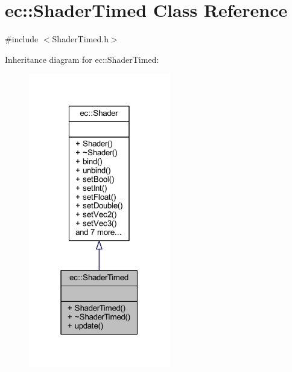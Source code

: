 \hypertarget{classec_1_1_shader_timed}{}\section{ec\+:\+:Shader\+Timed Class Reference}
\label{classec_1_1_shader_timed}


{\ttfamily \#include $<$Shader\+Timed.\+h$>$}



Inheritance diagram for ec\+:\+:Shader\+Timed\+:\nopagebreak
\begin{figure}[H]
\begin{center}
\leavevmode
\includegraphics[width=175pt]{classec_1_1_shader_timed__inherit__graph}
\end{center}
\end{figure}


